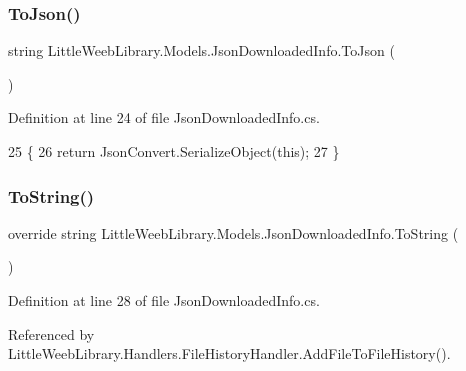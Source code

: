 \subsubsection{\texorpdfstring{To\+Json()}{ToJson()}}
{\footnotesize\ttfamily string Little\+Weeb\+Library.\+Models.\+Json\+Downloaded\+Info.\+To\+Json (\begin{DoxyParamCaption}{ }\end{DoxyParamCaption})}



Definition at line 24 of file Json\+Downloaded\+Info.\+cs.


\begin{DoxyCode}
25         \{
26             \textcolor{keywordflow}{return} JsonConvert.SerializeObject(\textcolor{keyword}{this});
27         \}
\end{DoxyCode}
\mbox{\label{class_little_weeb_library_1_1_models_1_1_json_downloaded_info_a1ffa120527f102b7bf96a4c0a2d9e298}} 
\subsubsection{\texorpdfstring{To\+String()}{ToString()}}
{\footnotesize\ttfamily override string Little\+Weeb\+Library.\+Models.\+Json\+Downloaded\+Info.\+To\+String (\begin{DoxyParamCaption}{ }\end{DoxyParamCaption})}



Definition at line 28 of file Json\+Downloaded\+Info.\+cs.



Referenced by Little\+Weeb\+Library.\+Handlers.\+File\+History\+Handler.\+Add\+File\+To\+File\+History().


